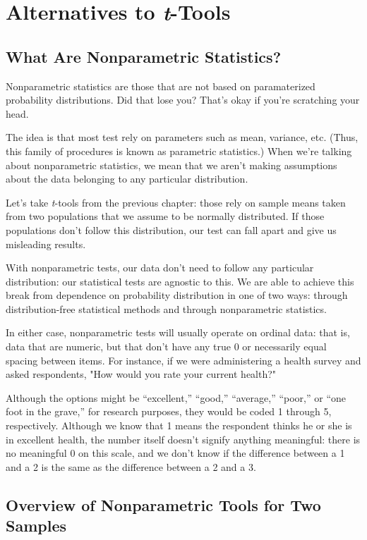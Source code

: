 
\chapter{Alternatives to \textit{t}-Tools}

\section{What Are Nonparametric Statistics?}

Nonparametric statistics are those that are not based on paramaterized probability distributions. Did that lose you? That's okay if you're scratching your head.

The idea is that most test rely on parameters such as mean, variance, etc. (Thus, this family of procedures is known as parametric statistics.) When we're talking about nonparametric statistics, we mean that we aren't making assumptions about the data belonging to any particular distribution.

Let's take \textit{t}-tools from the previous chapter: those rely on sample means taken from two populations that we assume to be normally distributed. If those populations don't follow this distribution, our test can fall apart and give us misleading results.

With nonparametric tests, our data don't need to follow any particular distribution: our statistical tests are agnostic to this. We are able to achieve this break from dependence on probability distribution in one of two ways: through distribution-free statistical methods and through nonparametric statistics.

In either case, nonparametric tests will usually operate on ordinal data: that is, data that are numeric, but that don't have any true 0 or necessarily equal spacing between items. For instance, if we were administering a health survey and asked respondents, "How would you rate your current health?"

Although the options might be ``excellent,'' ``good,'' ``average,'' ``poor,'' or ``one foot in the grave,'' for research purposes, they would be coded 1 through 5, respectively. Although we know that 1 means the respondent thinks he or she is in excellent health, the number itself doesn't signify anything meaningful: there is no meaningful 0 on this scale, and we don't know if the difference between a 1 and a 2 is the same as the difference between a 2 and a 3.

\section{Overview of Nonparametric Tools for Two Samples}


